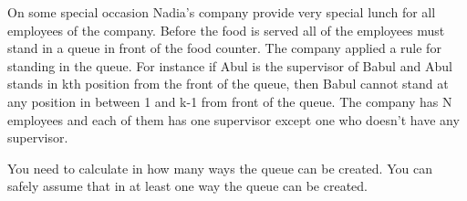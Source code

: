 On some special occasion Nadia’s company provide very special lunch for all employees of the company. Before the food is served all of the employees must stand in a queue in front of the food counter. The company applied a rule for standing in the queue. For instance if Abul is the supervisor of Babul and Abul stands in kth position from the front of the queue, then Babul cannot stand at any position in between 1 and k-1 from front of the queue. The company has N employees and each of them has one supervisor except one who doesn’t have any supervisor.  

   You need to calculate in how many ways the queue can be created. You can safely assume that in at least one way the queue can be created.